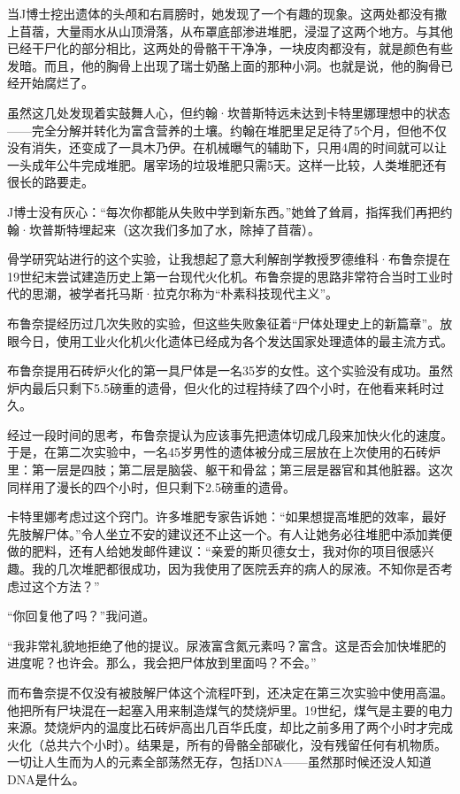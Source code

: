 \documentclass[12pt,oneside]{book}
\begin{document}
当J博士挖出遗体的头颅和右肩膀时，她发现了一个有趣的现象。这两处都没有撒上苜蓿，大量雨水从山顶滑落，从布罩底部渗进堆肥，浸湿了这两个地方。与其他已经干尸化的部分相比，这两处的骨骼干干净净，一块皮肉都没有，就是颜色有些发暗。而且，他的胸骨上出现了瑞士奶酪上面的那种小洞。也就是说，他的胸骨已经开始腐烂了。

虽然这几处发现着实鼓舞人心，但约翰·坎普斯特远未达到卡特里娜理想中的状态——完全分解并转化为富含营养的土壤。约翰在堆肥里足足待了5个月，但他不仅没有消失，还变成了一具木乃伊。在机械曝气的辅助下，只用4周的时间就可以让一头成年公牛完成堆肥。屠宰场的垃圾堆肥只需5天。这样一比较，人类堆肥还有很长的路要走。

J博士没有灰心：“每次你都能从失败中学到新东西。”她耸了耸肩，指挥我们再把约翰·坎普斯特埋起来（这次我们多加了水，除掉了苜蓿）。

骨学研究站进行的这个实验，让我想起了意大利解剖学教授罗德维科·布鲁奈提在19世纪末尝试建造历史上第一台现代火化机。布鲁奈提的思路非常符合当时工业时代的思潮，被学者托马斯·拉克尔称为“朴素科技现代主义”。

布鲁奈提经历过几次失败的实验，但这些失败象征着“尸体处理史上的新篇章”。放眼今日，使用工业火化机火化遗体已经成为各个发达国家处理遗体的最主流方式。

布鲁奈提用石砖炉火化的第一具尸体是一名35岁的女性。这个实验没有成功。虽然炉内最后只剩下5.5磅重的遗骨，但火化的过程持续了四个小时，在他看来耗时过久。

经过一段时间的思考，布鲁奈提认为应该事先把遗体切成几段来加快火化的速度。于是，在第二次实验中，一名45岁男性的遗体被分成三层放在上次使用的石砖炉里：第一层是四肢；第二层是脑袋、躯干和骨盆；第三层是器官和其他脏器。这次同样用了漫长的四个小时，但只剩下2.5磅重的遗骨。

卡特里娜考虑过这个窍门。许多堆肥专家告诉她：“如果想提高堆肥的效率，最好先肢解尸体。”令人坐立不安的建议还不止这一个。有人让她务必往堆肥中添加粪便做的肥料，还有人给她发邮件建议：“亲爱的斯贝德女士，我对你的项目很感兴趣。我的几次堆肥都很成功，因为我使用了医院丢弃的病人的尿液。不知你是否考虑过这个方法？”

“你回复他了吗？”我问道。

“我非常礼貌地拒绝了他的提议。尿液富含氮元素吗？富含。这是否会加快堆肥的进度呢？也许会。那么，我会把尸体放到里面吗？不会。”

而布鲁奈提不仅没有被肢解尸体这个流程吓到，还决定在第三次实验中使用高温。他把所有尸块混在一起塞入用来制造煤气的焚烧炉里。19世纪，煤气是主要的电力来源。焚烧炉内的温度比石砖炉高出几百华氏度，却比之前多用了两个小时才完成火化（总共六个小时）。结果是，所有的骨骼全部碳化，没有残留任何有机物质。一切让人生而为人的元素全部荡然无存，包括DNA——虽然那时候还没人知道DNA是什么。
\end{document}
